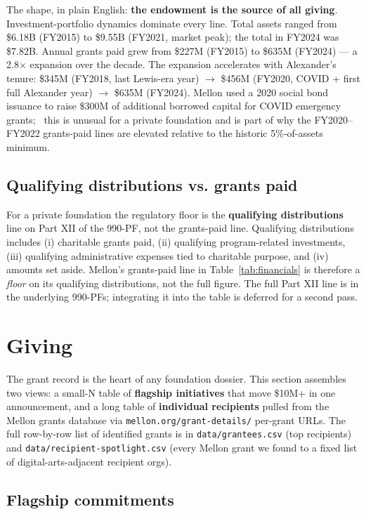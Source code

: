 \documentclass[10pt,letterpaper,twocolumn]{article}
\begin{document}
The shape, in plain English: \textbf{the endowment is the source of all giving}. Investment-portfolio dynamics dominate every line. Total assets ranged from \$6.18B (FY2015) to \$9.55B (FY2021, market peak); the total in FY2024 was \$7.82B. Annual grants paid grew from \$227M (FY2015) to \$635M (FY2024) --- a 2.8\(\times\) expansion over the decade. The expansion accelerates with Alexander's tenure: \$345M (FY2018, last Lewis-era year) $\to$ \$456M (FY2020, COVID + first full Alexander year) $\to$ \$635M (FY2024). Mellon used a 2020 social bond issuance to raise \$300M of additional borrowed capital for COVID emergency grants;~\citep{mellonfinancials} this is unusual for a private foundation and is part of why the FY2020--FY2022 grants-paid lines are elevated relative to the historic 5\%-of-assets minimum.

\subsection{Qualifying distributions vs. grants paid}

For a private foundation the regulatory floor is the \textbf{qualifying distributions} line on Part XII of the 990-PF, not the grants-paid line. Qualifying distributions includes (i) charitable grants paid, (ii) qualifying program-related investments, (iii) qualifying administrative expenses tied to charitable purpose, and (iv) amounts set aside. Mellon's grants-paid line in Table~\ref{tab:financials} is therefore a \emph{floor} on its qualifying distributions, not the full figure. The full Part XII line is in the underlying 990-PFs; integrating it into the table is deferred for a second pass.

\section{Giving}

The grant record is the heart of any foundation dossier. This section assembles two views: a small-N table of \textbf{flagship initiatives} that move \$10M+ in one announcement, and a long table of \textbf{individual recipients} pulled from the Mellon grants database via \texttt{mellon.org/grant-details/} per-grant URLs. The full row-by-row list of identified grants is in \texttt{data/grantees.csv} (top recipients) and \texttt{data/recipient-spotlight.csv} (every Mellon grant we found to a fixed list of digital-arts-adjacent recipient orgs).

\subsection{Flagship commitments}
\end{document}
